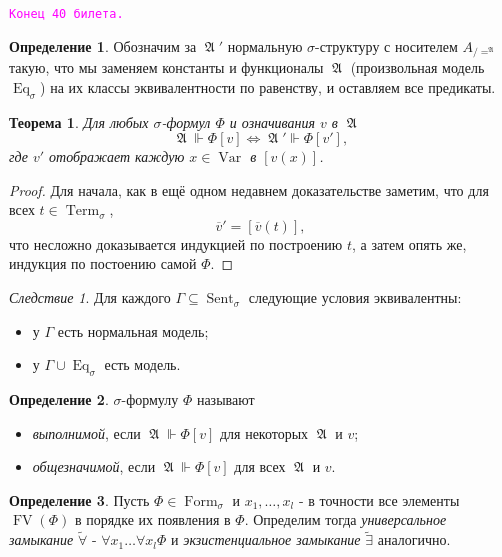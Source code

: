 \documentclass[a4paper,100pt]{article}
\theoremstyle{indented}
\newtheorem{theorem}{Теорема}
\theoremstyle{definition}
\newtheorem{defn}{Определение}
\theoremstyle{remark}
\newtheorem{cons}{Следствие}
\DeclareMathOperator{\Llra}{\Longleftrightarrow}
\DeclareMathOperator{\form}{Form}
\DeclareMathOperator{\Var}{Var}
\DeclareMathOperator{\Term}{Term}
\DeclareMathOperator{\FV}{FV}
\DeclareMathOperator{\Sent}{Sent}
\DeclareMathOperator{\Eq}{Eq}
\DeclareMathOperator{\GA}{\mathfrak{A}}
\begin{document}
\texttt{\textcolor{magenta}{Конец 40 билета.}} 

\hrulefill

\begin{defn}
  Обозначим за $\GA'$ нормальную $\sigma$-структуру с носителем $A_{/=^{\GA}}$ такую, что мы заменяем константы и функционалы $\GA$ (произвольная модель $\Eq_\sigma$) на их классы эквивалентности по равенству, и оставляем все предикаты.
\end{defn}

\begin{theorem}
  Для любых $\sigma$-формул $\Phi$ и означивания $v$ в $\GA$ 
  \[
    \GA \Vdash \Phi[v] \Llra \GA'\Vdash \Phi[v'], 
  \]
  где $v'$ отображает каждую $x\in \Var$ в $[v(x)]$. 
\end{theorem}

\begin{proof}
  Для начала, как в ещё одном недавнем доказательстве заметим, что для всех $t\in \Term_\sigma$, 
  \[
    \overline{v}'=[\overline{v}(t)],
  \]
  что несложно доказывается индукцией по построению $t$, а затем опять же, индукция по постоению самой $\Phi$. 
\end{proof}

\begin{cons}
  Для каждого $\Gamma\subseteq \Sent_\sigma$ следующие условия эквивалентны: 

  \begin{itemize}
    \item у $\Gamma$ есть нормальная модель; 
    \item у $\Gamma \cup \Eq_\sigma$ есть модель.
  \end{itemize}
\end{cons}

\begin{defn}
  $\sigma$-формулу $\Phi$ называют 

  \begin{itemize}
    \item \textit{выполнимой}, если $\GA \Vdash \Phi[v]$ для некоторых $\GA$ и $v$; 
    \item \textit{общезначимой}, если $\GA\Vdash \Phi[v]$ для всех $\GA$ и $v$. 
  \end{itemize}
\end{defn}

\begin{defn}
  Пусть $\Phi \in \form_\sigma$ и $x_1, \ldots, x_l$ - в точности все элементы $\FV(\Phi)$ в порядке их появления в $\Phi$. Определим тогда \textit{универсальное замыкание} $\tilde{\forall}$ - $\forall x_1 \ldots \forall x_l \Phi$ и \textit{экзистенциальное замыкание} $\tilde{\exists}$ аналогично.
\end{defn}
\end{document}
